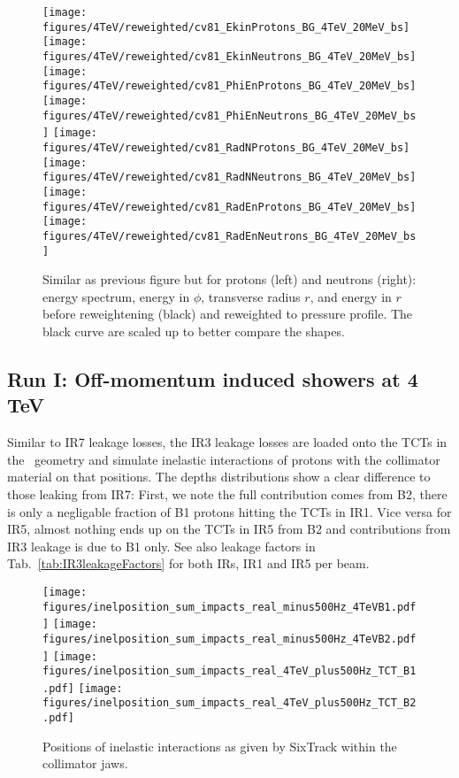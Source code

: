 \begin{figure}
\begin{center}
  \texttt{[image: figures/4TeV/reweighted/cv81\_EkinProtons\_BG\_4TeV\_20MeV\_bs]}
  \texttt{[image: figures/4TeV/reweighted/cv81\_EkinNeutrons\_BG\_4TeV\_20MeV\_bs]}
  \texttt{[image: figures/4TeV/reweighted/cv81\_PhiEnProtons\_BG\_4TeV\_20MeV\_bs]}
  \texttt{[image: figures/4TeV/reweighted/cv81\_PhiEnNeutrons\_BG\_4TeV\_20MeV\_bs]}
  \texttt{[image: figures/4TeV/reweighted/cv81\_RadNProtons\_BG\_4TeV\_20MeV\_bs]}
  \texttt{[image: figures/4TeV/reweighted/cv81\_RadNNeutrons\_BG\_4TeV\_20MeV\_bs]}
  \texttt{[image: figures/4TeV/reweighted/cv81\_RadEnProtons\_BG\_4TeV\_20MeV\_bs]}
  \texttt{[image: figures/4TeV/reweighted/cv81\_RadEnNeutrons\_BG\_4TeV\_20MeV\_bs]}
\end{center}
\vspace{-0.6cm}
 \caption{Similar as previous figure but for protons (left) and neutrons (right): energy spectrum, energy in $\phi$, transverse radius $r$, and energy in $r$ before reweightening (black) and reweighted to pressure profile. The black curve are scaled up to better compare the shapes. 
   \label{fig:cv81ProtNeut4TeV}}
\end{figure}
\newpage
\subsection{Run I: Off-momentum induced showers at 4 TeV}

Similar to IR7 leakage losses, the IR3 leakage losses are loaded onto the TCTs in the \fluka~geometry and simulate inelastic interactions of protons with the collimator material on that positions. The depths distributions show a clear difference to those leaking from IR7: First, we note the full contribution comes from B2, there is only a negligable fraction of B1 protons hitting the TCTs in IR1. Vice versa for IR5, almost nothing ends up on the TCTs in IR5 from B2 and contributions from IR3 leakage is due to B1 only. See also leakage factors in Tab.~\ref{tab:IR3leakageFactors} for both IRs, IR1 and IR5 per beam.

\begin{figure}
\begin{center}
\texttt{[image: figures/inelposition\_sum\_impacts\_real\_minus500Hz\_4TeVB1.pdf]}
\texttt{[image: figures/inelposition\_sum\_impacts\_real\_minus500Hz\_4TeVB2.pdf]}
\texttt{[image: figures/inelposition\_sum\_impacts\_real\_4TeV\_plus500Hz\_TCT\_B1.pdf]}
\texttt{[image: figures/inelposition\_sum\_impacts\_real\_4TeV\_plus500Hz\_TCT\_B2.pdf]}
\end{center}
\vspace{-0.6cm}
 \caption{Positions of inelastic interactions as given by SixTrack within the collimator jaws.
  \label{inel4TeVOffmom}}
\end{figure}


